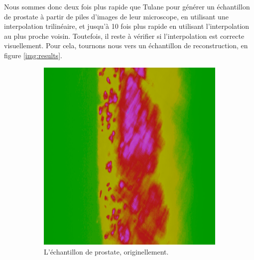 {{{            Nous sommes donc deux fois plus rapide que Tulane pour générer un échantillon de prostate à partir de piles d'images de leur microscope, en utilisant une interpolation trilinéaire, et jusqu'à 10 fois plus rapide en utilisant l'interpolation au plus proche voisin. Toutefois, il reste à vérifier si l'interpolation est correcte visuellement. Pour cela, tournons nous vers un échantillon de reconstruction, en figure \ref{img:results}.

            \begin{figure}[h]
                \centering
                \begin{subfigure}{.5\linewidth}
                    \centering
                    \includegraphics[width=.9\linewidth]{img/results/original.png}
                    \captionsetup{width=.9\linewidth}
                    \caption{L'échantillon de prostate, originellement.}
                    \label{img:results:original}
                \end{subfigure}
                \begin{subfigure}{.5\linewidth}
                    \centering

\end{subfigure}
\end{figure}}}}

